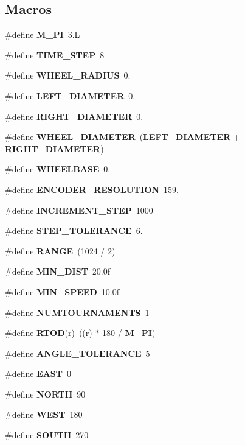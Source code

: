\subsection*{Macros}
\begin{DoxyCompactItemize}
\item 
\#define {\bf M\-\_\-\-P\-I}~3.\-L
\item 
\#define {\bf T\-I\-M\-E\-\_\-\-S\-T\-E\-P}~8
\item 
\#define {\bf W\-H\-E\-E\-L\-\_\-\-R\-A\-D\-I\-U\-S}~0.
\item 
\#define {\bf L\-E\-F\-T\-\_\-\-D\-I\-A\-M\-E\-T\-E\-R}~0.
\item 
\#define {\bf R\-I\-G\-H\-T\-\_\-\-D\-I\-A\-M\-E\-T\-E\-R}~0.
\item 
\#define {\bf W\-H\-E\-E\-L\-\_\-\-D\-I\-A\-M\-E\-T\-E\-R}~({\bf L\-E\-F\-T\-\_\-\-D\-I\-A\-M\-E\-T\-E\-R} + {\bf R\-I\-G\-H\-T\-\_\-\-D\-I\-A\-M\-E\-T\-E\-R})
\item 
\#define {\bf W\-H\-E\-E\-L\-B\-A\-S\-E}~0.
\item 
\#define {\bf E\-N\-C\-O\-D\-E\-R\-\_\-\-R\-E\-S\-O\-L\-U\-T\-I\-O\-N}~159.
\item 
\#define {\bf I\-N\-C\-R\-E\-M\-E\-N\-T\-\_\-\-S\-T\-E\-P}~1000
\item 
\#define {\bf S\-T\-E\-P\-\_\-\-T\-O\-L\-E\-R\-A\-N\-C\-E}~6.
\item 
\#define {\bf R\-A\-N\-G\-E}~(1024 / 2)
\item 
\#define {\bf M\-I\-N\-\_\-\-D\-I\-S\-T}~20.\-0f
\item 
\#define {\bf M\-I\-N\-\_\-\-S\-P\-E\-E\-D}~10.\-0f
\item 
\#define {\bf N\-U\-M\-T\-O\-U\-R\-N\-A\-M\-E\-N\-T\-S}~1
\item 
\#define {\bf R\-T\-O\-D}(r)~((r) $\ast$ 180 / {\bf M\-\_\-\-P\-I})
\item 
\#define {\bf A\-N\-G\-L\-E\-\_\-\-T\-O\-L\-E\-R\-A\-N\-C\-E}~5
\item 
\#define {\bf E\-A\-S\-T}~0
\item 
\#define {\bf N\-O\-R\-T\-H}~90
\item 
\#define {\bf W\-E\-S\-T}~180
\item 
\#define {\bf S\-O\-U\-T\-H}~270
\end{DoxyCompactItemize}
